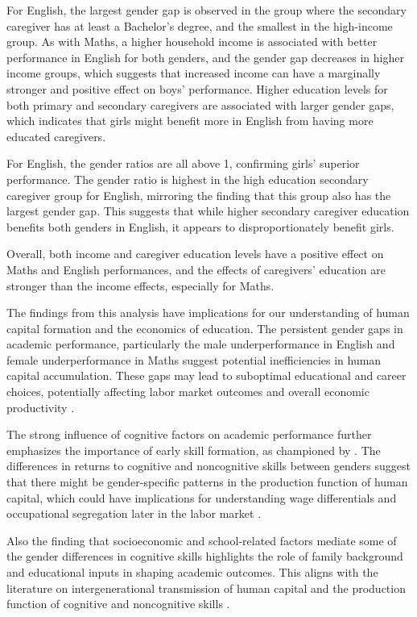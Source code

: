 \documentclass[12pt,a4paper,onecolumn]{article}
\numberwithin{equation}{section}
\begin{document}
For English, the largest gender gap is observed in the group where the secondary caregiver has at least a Bachelor's degree, and the smallest in the high-income group. As with Maths, a higher household income is associated with better performance in English for both genders, and the gender gap decreases in higher income groups, which suggests that increased income can have a marginally stronger and positive effect on boys' performance. Higher education levels for both primary and secondary caregivers are associated with larger gender gaps, which indicates that girls might benefit more in English from having more educated caregivers.

For English, the gender ratios are all above 1, confirming girls' superior performance. The gender ratio is highest in the high education secondary caregiver group for English, mirroring the finding that this group also has the largest gender gap. This suggests that while higher secondary caregiver education benefits both genders in English, it appears to disproportionately benefit girls.

Overall, both income and caregiver education levels have a positive effect on Maths and English performances, and the effects of caregivers' education are stronger than the income effects, especially for Maths. 

The findings from this analysis have implications for our understanding of human capital formation and the economics of education. The persistent gender gaps in academic performance, particularly the male underperformance in English and female underperformance in Maths suggest potential inefficiencies in human capital accumulation. These gaps may lead to suboptimal educational and career choices, potentially affecting labor market outcomes and overall economic productivity \parencite{altonji1999race}.

The strong influence of cognitive factors on academic performance further emphasizes the importance of early skill formation, as championed by \textcite{heckman2006skill}. The differences in returns to cognitive and noncognitive skills between genders suggest that there might be gender-specific patterns in the production function of human capital, which could have implications for understanding wage differentials and occupational segregation later in the labor market \parencite{blau2017gender}.

Also the finding that socioeconomic and school-related factors mediate some of the gender differences in cognitive skills highlights the role of family background and educational inputs in shaping academic outcomes. This aligns with the literature on intergenerational transmission of human capital and the production function of cognitive and noncognitive skills \parencite{cunha2007technology}.
\end{document}
